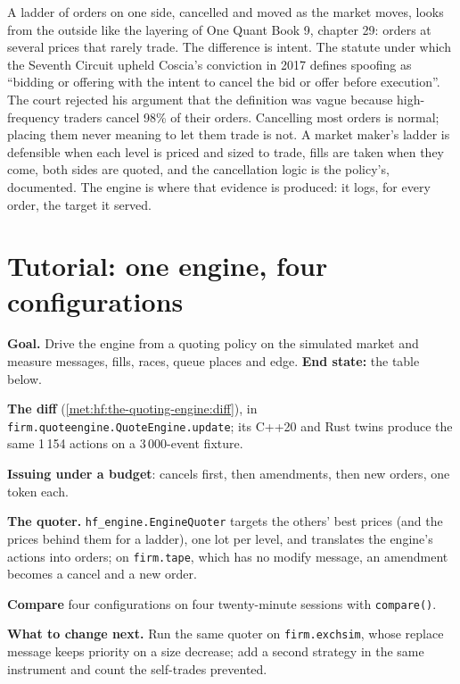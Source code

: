 A ladder of orders on one side, cancelled and moved as the market moves, looks from the outside like the layering of One Quant Book 9, chapter
29: orders at several prices that rarely trade. The difference is intent. The statute under which the Seventh Circuit upheld Coscia's conviction in
2017 defines spoofing as ``bidding or offering with the intent to cancel the bid or offer before execution''. The court rejected his argument that
the definition was vague because high-frequency traders cancel 98\% of their orders. Cancelling most orders is normal; placing them never meaning to
let them trade is not. A market maker's ladder is defensible when each level is priced and sized to trade, fills are taken when they come, both sides
are quoted, and the cancellation logic is the policy's, documented. The engine is where that evidence is produced: it logs, for every order, the
target it served.

\section{Tutorial: one engine, four configurations}\label{tut:hf:the-quoting-engine:tut}

\begin{tutorial}
\textbf{Goal.} Drive the engine from a quoting policy on the simulated market and measure messages, fills, races, queue places and edge.
\textbf{End state:} the table below.
\begin{tutsteps}
\item \textbf{The diff} (\cref{met:hf:the-quoting-engine:diff}), in \texttt{firm.quoteengine.QuoteEngine.update}; its C++20 and Rust twins produce the
same 1\,154 actions on a 3\,000-event fixture.
\label{lst:hf:the-quoting-engine:diff}
\item \textbf{Issuing under a budget}: cancels first, then amendments, then new orders, one token each.
\label{lst:hf:the-quoting-engine:issue}
\item \textbf{The quoter.} \texttt{hf\_engine.EngineQuoter} targets the others' best prices (and the prices behind them for a ladder), one lot per
level, and translates the engine's actions into orders; on \texttt{firm.tape}, which has no modify message, an amendment becomes a cancel and a new
order.
\item \textbf{Compare} four configurations on four twenty-minute sessions with \texttt{compare()}.
\end{tutsteps}
\textbf{What to change next.} Run the same quoter on \texttt{firm.exchsim}, whose replace message keeps priority on a size decrease; add a second
strategy in the same instrument and count the self-trades prevented.
\end{tutorial}

